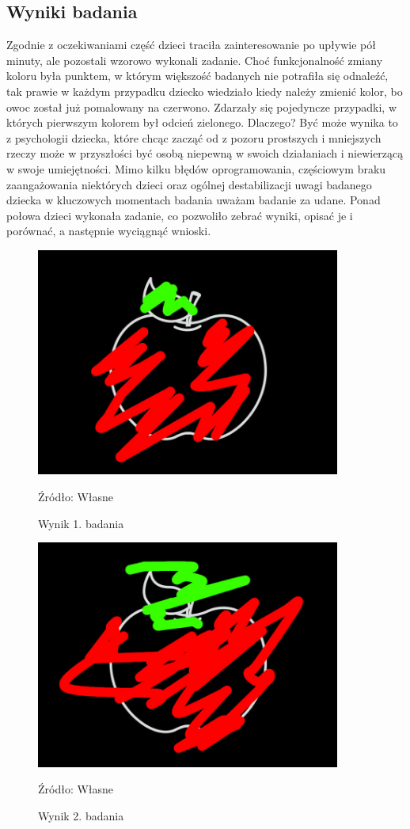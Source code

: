 \documentclass{article}
\begin{document}
\subsection{Wyniki badania}
	
\par Zgodnie z oczekiwaniami część dzieci traciła zainteresowanie po upływie pół minuty, ale pozostali wzorowo wykonali zadanie. Choć funkcjonalność zmiany koloru była punktem, w którym większość badanych nie potrafiła się odnaleźć, tak prawie w każdym przypadku dziecko wiedziało kiedy należy zmienić kolor, bo owoc został już pomalowany na czerwono. Zdarzały się pojedyncze przypadki, w których pierwszym kolorem był odcień zielonego. Dlaczego? Być może wynika to z psychologii dziecka, które chcąc zacząć od z pozoru prostszych i mniejszych rzeczy może w przyszłości być osobą niepewną w swoich działaniach i niewierzącą w swoje umiejętności. Mimo kilku błędów oprogramowania, częściowym braku zaangażowania niektórych dzieci oraz ogólnej destabilizacji uwagi badanego dziecka w kluczowych momentach badania uważam badanie za udane. Ponad połowa dzieci wykonała zadanie, co pozwoliło zebrać wyniki, opisać je i porównać, a następnie wyciągnąć wnioski.
	

\begin{figure}[bp!]
	\centering
	\includegraphics[width=10cm]{wyniki/1}
	\caption{Wynik 1. badania}
	Źródło: Własne
\end{figure}

\begin{figure}[bp!]
	\centering
	\includegraphics[width=10cm]{wyniki/2}
	\caption{Wynik 2. badania}
	Źródło: Własne
\end{figure}
\end{document}
